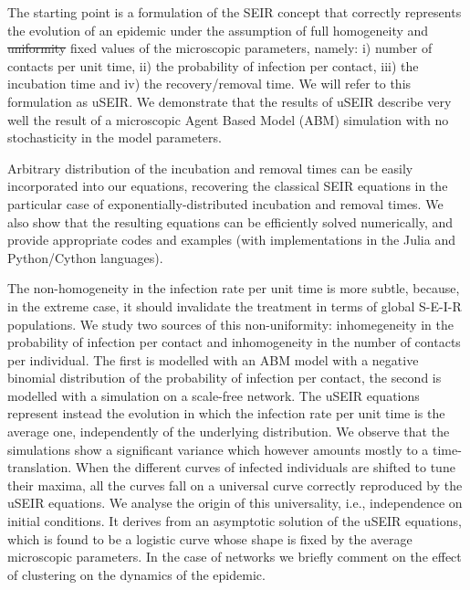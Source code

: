 \documentclass[10pt,letterpaper]{article}
\newcommand{\mychange}[2]{\textcolor[rgb]{0.75,0,0}{\st{#1} {#2}}}
\begin{document}

The starting point is a formulation of the SEIR concept that correctly 
represents the evolution of an epidemic under the assumption of full homogeneity and \mychange{uniformity}{fixed values} of the microscopic parameters, namely: i) number of contacts per unit time, ii) the probability of infection per contact, iii) the incubation time and iv) the recovery/removal time. We will refer to this formulation as uSEIR. We demonstrate that the results of uSEIR describe very well the result of a microscopic Agent Based Model (ABM) simulation with no stochasticity in the model parameters.

Arbitrary distribution of the incubation and removal times can be easily  incorporated into our equations, recovering the classical SEIR equations in the particular case of exponentially-distributed incubation and {removal} times. We also show that the resulting equations can be efficiently solved numerically, and provide appropriate codes and examples (with implementations in the Julia and Python/Cython languages). 

The non-homogeneity in the infection rate per unit time is more subtle, because, in the extreme case, it should invalidate the treatment in terms of global S-E-I-R populations. We study two sources of this non-uniformity: inhomegeneity in the probability of infection per contact and inhomogeneity in the number of contacts per individual. The first is modelled with an ABM model with a negative binomial distribution of the probability of infection per contact, the second is modelled with a simulation on a scale-free network. The uSEIR equations represent instead the evolution in which the infection rate per unit time is the average one, independently of the underlying distribution. We observe that the simulations show a significant variance which however amounts mostly to a time-translation. When the different curves of infected individuals are shifted to tune their maxima, all the curves fall on a universal curve correctly reproduced by the uSEIR equations. We analyse the origin of this universality, i.e., independence on initial conditions. It derives from an asymptotic solution of the uSEIR equations, which is found to be a logistic curve whose shape is fixed by the average microscopic parameters. In the case of networks we briefly comment on the effect of clustering on the dynamics of the epidemic. 
\end{document}
